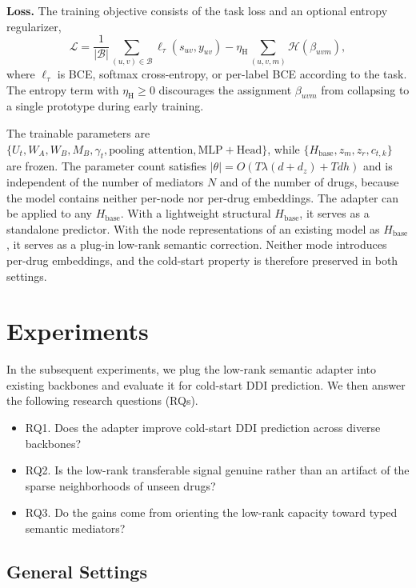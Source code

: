 \documentclass[letterpaper]{article} %
\begin{document}
\textbf{Loss.} The training objective consists of the task loss and an optional entropy regularizer,
\begin{equation}
\mathcal{L} = \frac{1}{|\mathcal{B}|}\sum_{(u,v)\in\mathcal{B}} \ell_\tau(s_{uv}, y_{uv}) - \eta_{\mathrm{H}}\sum_{(u,v,m)} \mathcal{H}(\beta_{uvm}),
\end{equation}
where $\ell_\tau$ is BCE, softmax cross-entropy, or per-label BCE according to the task. The entropy term with $\eta_{\mathrm{H}}\ge 0$ discourages the assignment $\beta_{uvm}$ from collapsing to a single prototype during early training.

The trainable parameters are $\{U_t, W_A, W_B, M_B, \gamma_t, \text{pooling attention}, \mathrm{MLP}+\mathrm{Head}\}$, while $\{H_{\mathrm{base}}, z_m, z_r, c_{t,k}\}$ are frozen. The parameter count satisfies $|\theta| = O(T\lambda(d+d_z) + Tdh)$ and is independent of the number of mediators $N$ and of the number of drugs, because the model contains neither per-node nor per-drug embeddings. The adapter can be applied to any $H_{\mathrm{base}}$. With a lightweight structural $H_{\mathrm{base}}$, it serves as a standalone predictor. With the node representations of an existing model as $H_{\mathrm{base}}$, it serves as a plug-in low-rank semantic correction. Neither mode introduces per-drug embeddings, and the cold-start property is therefore preserved in both settings.

\section{Experiments}
In the subsequent experiments, we plug the low-rank semantic adapter into existing backbones and evaluate it for cold-start DDI prediction. We then answer the following research questions (RQs).
\begin{itemize}
    \item RQ1. Does the adapter improve cold-start DDI prediction across diverse backbones? 
    \item RQ2. Is the low-rank transferable signal genuine rather than an artifact of the sparse neighborhoods of unseen drugs?
    \item RQ3. Do the gains come from orienting the low-rank capacity toward typed semantic mediators?
\end{itemize}


\subsection{General Settings}
\end{document}
